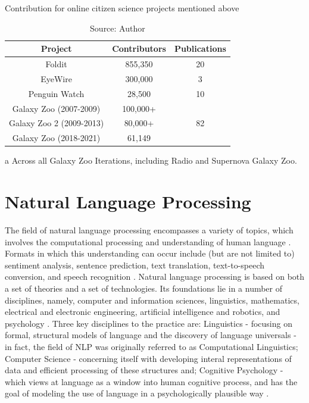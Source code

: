 \begin{table}[h]
\centering
\caption{Contribution for online citizen science projects mentioned above}
\label{tab:cs-contributions}
\begin{threeparttable}
    \small{
    \begin{tabular}{|c|c|c|}
        \hline 
        Project & Contributors & Publications \\ \hline
        Foldit & 855,350 \cite{foldit2021players} & 20 \cite{foldit2021publications} \\ \hline
        EyeWire & 300,000 \cite{eyewire2017players} & 3 \cite{eyewire2021publications} \\ \hline
        Penguin Watch & 28,500 \cite{penguin2021players} & 10 \cite{penguin2021publications} \\ \hline
        Galaxy Zoo (2007-2009) & 100,000+ \cite{lintott2011galaxy} & \multirow{3}{*}{82 \cite{galaxyzoo2021publications}\tnote{~a}} \\ \cline{1-2} 
        Galaxy Zoo 2 (2009-2013) & 80,000+ \cite{galaxyzoo22021volunteers} & \\ \cline{1-2} 
        Galaxy Zoo (2018-2021) & 61,149 \cite{galaxyzoo2021players} & \\ \hline 
    \end{tabular}}
    \begin{tablenotes}
        \item[a] Across all Galaxy Zoo Iterations, including Radio and Supernova Galaxy Zoo.
    \end{tablenotes}
\end{threeparttable}
\caption*{Source: Author}
\end{table}

\section{Natural Language Processing}

The field of natural language processing encompasses a variety of topics, which involves the computational processing and understanding of human language \cite{otter2020survey}. Formats in which this understanding can occur include (but are not limited to) sentiment analysis, sentence prediction, text translation, text-to-speech conversion, and speech recognition \cite{chowdhury2003natural}. Natural language processing is based on both a set of theories and a set of technologies. Its foundations lie in a number of disciplines, namely, computer and information sciences, linguistics, mathematics, electrical and electronic engineering, artificial intelligence and robotics, and psychology \cite{chowdhury2003natural}. Three key disciplines to the practice are: Linguistics - focusing on formal, structural models of language and the discovery of language universals - in fact, the field of NLP was originally referred to as Computational Linguistics; Computer Science - concerning itself with developing interal representations of data and efficient processing of these structures and; Cognitive Psychology - which views at language as a window into human cognitive process, and has the goal of modeling the use of language in a psychologically plausible way  \cite{liddy2001natural}.

